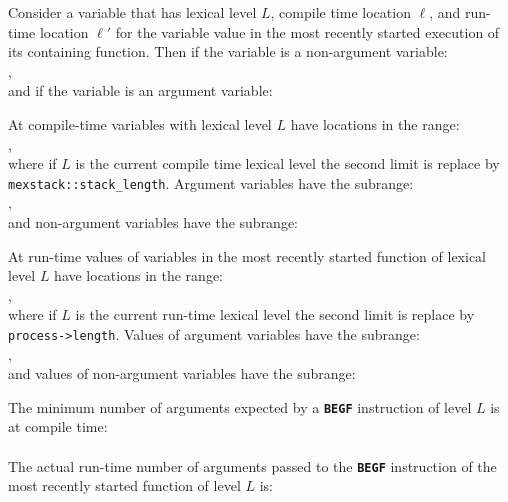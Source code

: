 \documentclass[12pt]{article}
\newcommand{\TT}[1]{{\tt \bfseries #1}}
\newcommand{\EOL}{\penalty \exhyphenpenalty}
\newenvironment{indpar}[1][0.3in]%
	{\begin{list}{}%
		     {\setlength{\itemsep}{0in}%
		      \setlength{\topsep}{0in}%
		      \setlength{\parsep}{1ex}%
		      \setlength{\labelwidth}{#1}%
		      \setlength{\leftmargin}{#1}%
		      \addtolength{\leftmargin}{\labelsep}}%
	 \item}%
	{\end{list}}
\begin{document}
\begin{indpar}
Consider a variable that has lexical level $L$,
compile time location $\ell$,
and run-time location $\ell'$ for the variable value in the most recently
started execution of its containing function.
Then if the variable is a non-argument variable:\label{FP} \\
\hspace*{1in}{\tt $\ell$ - mexstack::fp[$L$] == $\ell'$ - process->fp[$L$]}, \\
and if the variable is an argument variable:\label{AP} \\
\hspace*{1in}{\tt $\ell$ - mexstack::ap[$L$] == $\ell'$ - process->ap[$L$]}

At compile-time variables with lexical level $L$ have locations in
the range:\label{LP} \\
\hspace*{1in}{\tt [ mexstack::ap[$L$], mexstack::ap[$L$+1] )}, \\
where if $L$ is the current compile time lexical level the second
limit is replace by {\tt mexstack::stack\_length}.
Argument variables have the subrange: \\
\hspace*{1in}{\tt [ mexstack::ap[$L$], mexstack::fp[$L$] )}, \\
and non-argument variables have the subrange: \\
\hspace*{1in}{\tt [ mexstack::fp[$L$], mexstack::ap[$L$+1] )}

At run-time values of variables in the most recently started
function of lexical level $L$ have locations in
the range: \\
\hspace*{1in}{\tt [ process->ap[$L$], process->ap[$L$+1] )}, \\
where if $L$ is the current run-time lexical level the second
limit is replace by {\tt process->\EOL length}.
Values of argument variables have the subrange: \\
\hspace*{1in}{\tt [ process->ap[$L$], process->fp[$L$] )}, \\
and values of non-argument variables have the subrange: \\
\hspace*{1in}{\tt [ process->fp[$L$], process->ap[$L$+1] )}

The minimum number of arguments expected by a \TT{BEGF} instruction
of level $L$
is at compile time: \\
\hspace*{1in}{\tt mexstack::ap[$L$] - mexstack::fp[$L$]} \\
The actual run-time  number of arguments passed to the \TT{BEGF} instruction
of the most recently started function of level $L$
is: \\
\hspace*{1in}{\tt process->ap[$L$] - process->fp[$L$]}


\end{indpar}
\end{document}
